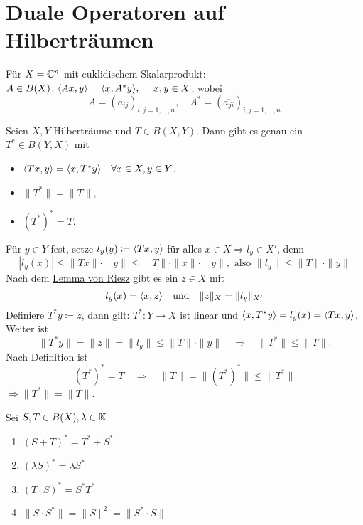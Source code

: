 


\section{Duale Operatoren auf Hilberträumen}



Für $X = \mathbb{C}^{n}$ mit euklidischem Skalarprodukt: \\
$A \in B(X) \colon \< A x , y \> = \< x , A^{*} y \>, \quad x, y \in X$, wobei
\[ A = (a_{ij})_{i, j = 1, \dotsc, n}, \quad A^{*} = (\overline{a_{ji}})_{i, j = 1, \dotsc, n} \]


\begin{satz}
	Seien $X, Y$ Hilberträume und $T \in B(X, Y)$. Dann gibt es genau ein $T^{*} \in B(Y, X)$ mit
	\begin{itemize}
		\item $\langle T x , y \rangle = \langle x , T^{*} y \rangle \quad \forall x \in X, y \in Y$,
		\item $\| T^{*} \| = \| T \|$,
		\item $\left(T	^{*}\right)^{*} = T$.
	\end{itemize}	
\end{satz}

\begin{beweis}
	Für $y \in Y$ fest, setze $l_{y}(y) \coloneqq \langle T x , y \rangle$ für alles $x \in X \Rightarrow l_{y} \in X'$, denn
	\[ | l_{y}(x) | \leq \| T x \| \cdot \| y \| \leq \|T \| \cdot \| x \| \cdot \| y \|, \text{ also } \| l_{y} \| \leq \| T \| \cdot \| y \| \]
	Nach dem \hyperref[lemma:6.3-Riesz]{Lemma von Riesz} gibt es ein $z \in X$ mit
	\[ l_{y} (x) = \langle x , z \rangle \quad \text{und} \quad \| z \|_{X} = \| l_{y} \|_{X'} \]
	Definiere $T^{*} y \coloneqq z$, dann gilt: $T^{*} \colon Y \rightarrow X$ ist linear und $\langle x , T^{*} y \rangle = l_{y}(x) = \langle T x , y \rangle$. \\
	Weiter ist 
	\[ \| T^{*} y \| = \| z \| = \| l_{y} \| \leq \| T \| \cdot \| y \| \quad \Rightarrow \quad \| T^{*} \| \leq \| T \|. \]
	Nach Definition ist 
	\[ \left( T^{*} \right)^{*} = T \quad \Rightarrow \quad \| T \| = \| \left( T^{*} \right)^{*} \| \leq \| T^{*} \| \]
	$\Rightarrow \| T^{*} \| = \| T \|$. 
\end{beweis}


\begin{bemerkung}
	Sei $S, T \in B(X), \lambda \in \mathbb{K}$
	\begin{enumerate}[label=\alph*\upshape)]
		\item $\left( S + T \right)^{*} = T^{*} + S^{*}$
		\item $\left( \lambda S \right)^{*} = \overline{\lambda} S^{*}$
		\item $\left( T \cdot S \right)^{*} = S^{*} T^{*}$
		\item $\| S \cdot S^{*} \| = \| S \|^{2} = \| S^{*} \cdot S \|$
	\end{enumerate}
\end{bemerkung}

